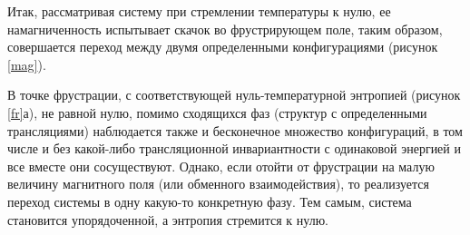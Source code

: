 
Итак, рассматривая систему при стремлении температуры к нулю, ее намагниченность испытывает скачок во фрустрирующем поле, таким образом, совершается переход между двумя определенными конфигурациями (рисунок \ref{mag}).

В точке фрустрации, с соответствующей нуль-температурной энтропией (рисунок \ref{fr}а), не равной нулю, помимо сходящихся фаз (структур с определенными трансляциями) наблюдается также и бесконечное множество конфигураций, в том числе и без какой-либо трансляционной инвариантности с одинаковой энергией и все вместе они сосуществуют. Однако, если отойти от фрустрации на малую величину магнитного поля (или обменного взаимодействия), то реализуется переход системы в одну какую-то конкретную фазу. Тем самым, система становится упорядоченной, а энтропия стремится к нулю.


